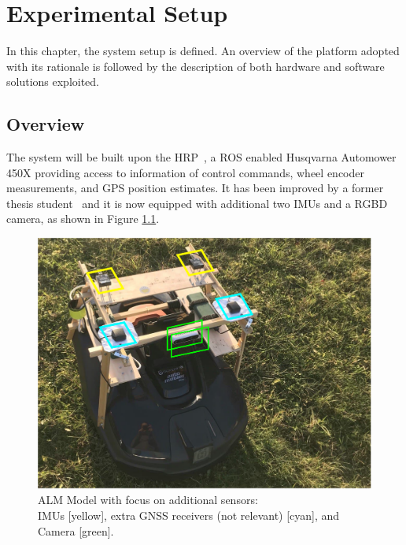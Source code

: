 \chapter{Experimental Setup}
\label{ch:setup}



\noindent In this chapter, the system setup is defined.
An overview of the platform adopted with its rationale is followed by the description of both hardware and software solutions exploited.

\section{Overview}
\label{sec:over-system}

\noindent
The system will be built upon the \Gls{HRP}~\cite{HRP}, a \Gls{ROS} enabled Husqvarna Automower 450X providing access to information of control commands, wheel encoder measurements, and GPS position estimates.
It has been improved by a former thesis student~\cite{HRPTianze} and it is now equipped with additional two \Glspl{IMU} and a \Gls{RGBD} camera, as shown in Figure \ref{fig:HardwareSetup}.
\begin{figure}[!ht]
	\begin{center}
		\includegraphics[clip, trim=0.5cm 0.6cm 8.5cm 0.6cm , width=0.45 \textwidth]{Images/1-Introduction/projectTheme.pdf}
		\caption{
			\gls{ALM} Model with focus on additional sensors:\\
			\glspl{IMU} [yellow], extra \gls{GNSS} receivers (not relevant) [cyan], and Camera [green].
			\centering }
		\label{fig:HardwareSetup}
	\end{center}
\end{figure}



